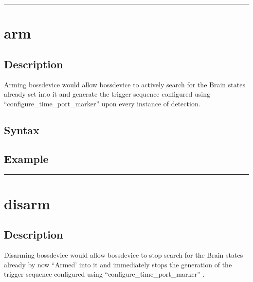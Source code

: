 \documentclass[letterpaper,10pt,english]{sphinxmanual}
\begin{document}
\bigskip\hrule\bigskip



\section{arm}
\label{\detokenize{4_api_documentation:arm}}

\subsection{Description}
\label{\detokenize{4_api_documentation:id42}}
Arming bossdevice would allow bossdevice to actively search for the Brain states already set into it and generate the trigger sequence configured using “configure\_time\_port\_marker” upon every instance of detection.


\subsection{Syntax}
\label{\detokenize{4_api_documentation:id43}}
\begin{sphinxVerbatim}[commandchars=\\\{\}]
\end{sphinxVerbatim}


\subsection{Example}
\label{\detokenize{4_api_documentation:id44}}
\begin{sphinxVerbatim}[commandchars=\\\{\}]
 
\end{sphinxVerbatim}


\bigskip\hrule\bigskip



\section{disarm}
\label{\detokenize{4_api_documentation:disarm}}

\subsection{Description}
\label{\detokenize{4_api_documentation:id45}}
Disarming bossdevice would allow bossdevice to stop search for the Brain states already by now “Armed’ into it and immediately stops the generation of the trigger sequence configured using “configure\_time\_port\_marker” .
\end{document}
